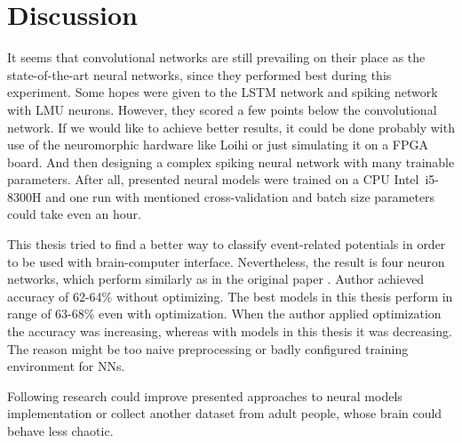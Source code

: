 \chapter{Discussion}%
\label{cha:discussion}

It seems that convolutional networks are still prevailing on their place as the state-of-the-art neural networks, since they performed best during this experiment. Some hopes were given to the LSTM network and spiking network with LMU neurons. However, they scored a few points below the convolutional network. If we would like to achieve better results, it could be done probably with use of the neuromorphic hardware like Loihi or just simulating it on a FPGA board. And then designing a complex spiking neural network with many trainable parameters. After all, presented neural models were trained on a CPU Intel~i5-8300H and one run with mentioned cross-validation and batch size parameters could take even an hour.

This thesis tried to find a better way to classify event-related potentials in order to be used with brain-computer interface. Nevertheless, the result is four neuron networks, which perform similarly as in the original paper \cite{varekap300}. Author achieved accuracy of 62-64\% without optimizing. The best models in this thesis perform in range of 63-68\% even with optimization. When the author applied optimization the accuracy was increasing, whereas with models in this thesis it was decreasing. The reason might be too naive preprocessing or badly configured training environment for NNs.

Following research could improve presented approaches to neural models implementation or collect another dataset from adult people, whose brain could behave less chaotic.

